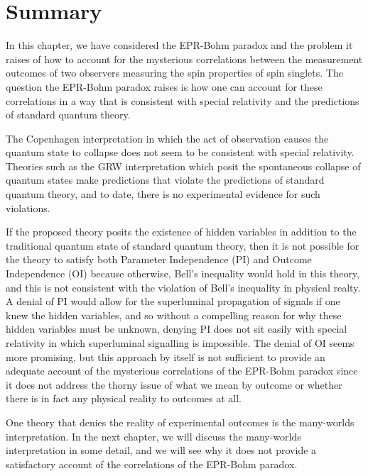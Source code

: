 
\section{Summary}
In this chapter, we have considered the EPR-Bohm paradox and the problem it raises of how to account for the mysterious correlations between the measurement outcomes of two observers measuring the spin properties of spin singlets. The question the EPR-Bohm paradox raises is how one can  account for these correlations in a way that is consistent with special relativity and the predictions of standard quantum theory.

The Copenhagen interpretation in which the act of observation causes the quantum state to collapse does not seem to be consistent with special relativity. Theories such as the GRW interpretation which posit the spontaneous collapse of quantum states make predictions that violate the predictions of standard quantum theory, and to date, there is no experimental evidence for such violations. 

If the proposed theory posits the existence of hidden variables in addition to the traditional quantum state of standard quantum theory, then it is not possible for the theory to satisfy both Parameter Independence (PI) and Outcome Independence (OI) because otherwise, Bell's inequality would hold in this theory, and this is not consistent with the violation of Bell's inequality in physical realty. A denial of PI would allow for the superluminal propagation of signals if one knew the hidden variables, and so without a compelling reason for why these hidden variables must be  unknown, denying PI does not sit easily with special relativity in which superluminal signalling is impossible. The denial of OI seems more promising, but this approach by itself is not sufficient to provide an adequate account of the mysterious correlations of the EPR-Bohm paradox since it does not address the thorny issue of what we mean by outcome or whether there is in fact any physical reality to outcomes at all. 

One theory that denies the reality of experimental outcomes is the many-worlds interpretation. In the next chapter, we will discuss the many-worlds interpretation in some detail, and we will see why it does not provide a satisfactory account of the correlations of the EPR-Bohm paradox.